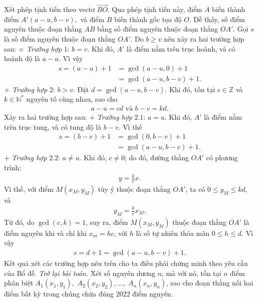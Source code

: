 \begin{multicols}{2}
	\vskip 0.05cm
	Xét phép tịnh tiến theo vectơ $\overrightarrow{BO}$. Qua phép tịnh tiến này, điểm $A$ biến thành điểm $A'\left( {a - u,b - v} \right),$  và điểm $B$ biến thành gốc tọa độ $O$. Dễ thấy, số điểm nguyên thuộc đoạn thẳng $AB$ bằng số điểm nguyên thuộc đoạn thẳng $OA'$.
	\vskip 0.05cm 
	Gọi $s$ là số điểm nguyên thuộc đoạn thẳng $OA'$.
	\vskip 0.05cm
	Do $b \ge  v$ nên xảy ra hai trường hợp sau:
	\vskip 0.05cm
	$\diamond$ \textit{Trường hợp} $1$: $b = v$.
	\vskip 0.05cm
	Khi đó, $A'$  là điểm nằm trên trục hoành, và có hoành độ là $a - u$. Vì vậy
	\begin{align*}
		s = (a - u) + 1 &= \gcd(a - u, 0) + 1 \\
		&= \gcd(a - u, b - v) + 1.
	\end{align*}
	$\diamond$ \textit{Trường hợp} $2$: $b > v$.
	\vskip 0.05cm
	Đặt $d = \gcd(a - u, b - v)$.
	\vskip 0.05cm
	Khi đó, tồn tại $c\in \mathbb{Z}$  và $k \in \mathbb{N^*}$  nguyên tố cùng nhau, sao cho
	\begin{align*}
		a - u = cd \text{ và } b - v = kd.
	\end{align*}
	Xảy ra hai trường hợp sau:
	\vskip 0.05cm
	$+$ \textit{Trường hợp} $2.1$: $a = u$.
	\vskip 0.05cm
	Khi đó, $A'$  là điểm nằm trên trục tung, và có tung độ là $b - v$. Vì thế
	\begin{align*}
		s = (b - v) + 1 &= \gcd(0, b - v) + 1 \\
		&= \gcd(a - u, b - v) + 1.
	\end{align*}
	$+$ \textit{Trường hợp} $2.2$: $a \ne u$.
	\vskip 0.05cm
	Khi đó, $c \ne 0$; do đó, đường thẳng $OA'$  có phương trình:
	\begin{align*}
		y = \frac{k}{c}x.
	\end{align*}
	Vì thế, với điểm $M\left( {{x_M},{y_M}} \right)$  tùy ý thuộc đoạn thẳng $OA'$,  ta có $0 \le {y_M} \le kd,$  và
	\begin{align*}
		{y_M} = \frac{k}{c}{x_M}.
	\end{align*}
	Từ đó, do $\gcd(c, k) = 1$, suy ra, điểm  $M\left( {{x_M},{y_M}} \right)$ thuộc đoạn thẳng  $OA'$ là điểm nguyên khi và chỉ khi $x_m = hc$,  với $h$ là số tự nhiên thỏa mãn $0 \le h \le d$. Vì vậy
	\begin{align*}
		s = d + 1 = \gcd(a - u, b - v) + 1.
	\end{align*}
	Kết quả xét các trường hợp nêu trên cho ta điều phải chứng minh theo yêu cầu của Bổ đề.
	\vskip 0.05cm
	\textit{Trở lại bài toán.}
	\vskip 0.05cm
	Xét số nguyên dương $n$, mà với nó, tồn tại $n$ điểm phân biệt  ${A_1}\left( {{x_1},{y_1}} \right),$ ${A_2}\left( {{x_2},{y_2}} \right), \ldots ,$ ${A_n}\left( {{x_n},{y_n}} \right)$, sao cho đoạn thẳng nối hai điểm bất kỳ trong chúng chứa đúng $2022$ điểm nguyên.

\end{multicols}
